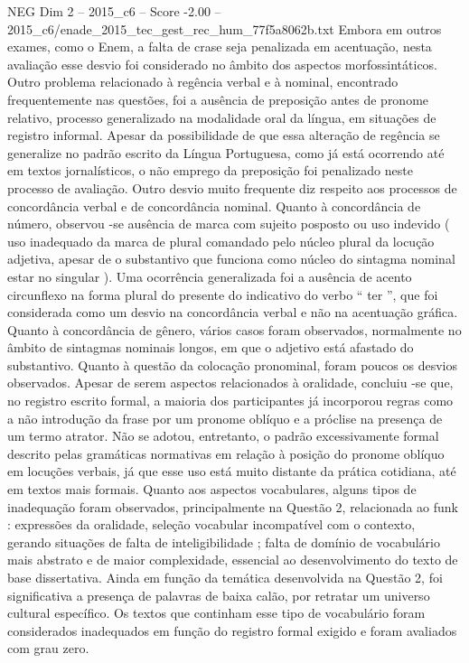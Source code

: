 \begin{textsample}{NEG Dim 2 – 2015\_c6 – Score -2.00 – 2015\_c6/enade\_2015\_tec\_gest\_rec\_hum\_77f5a8062b.txt}
Embora em outros exames, como o Enem, a falta de crase seja penalizada em acentuação, nesta avaliação esse desvio foi considerado no âmbito dos aspectos morfossintáticos.
Outro problema relacionado à regência verbal e à nominal, encontrado frequentemente nas questões, foi a ausência de preposição antes de pronome relativo, processo generalizado na modalidade oral da língua, em situações de registro informal.
Apesar da possibilidade de que essa alteração de regência se generalize no padrão escrito da Língua Portuguesa, como já está ocorrendo até em textos jornalísticos, o não emprego da preposição foi penalizado neste processo de avaliação.
Outro desvio muito frequente diz respeito aos processos de concordância verbal e de concordância nominal.
Quanto à concordância de número, observou -se ausência de marca com sujeito posposto ou uso indevido ( uso inadequado da marca de plural comandado pelo núcleo plural da locução adjetiva, apesar de o substantivo que funciona como núcleo do sintagma nominal estar no singular ).
Uma ocorrência generalizada foi a ausência de acento circunflexo na forma plural do presente do indicativo do verbo “ ter ”, que foi considerada como um desvio na concordância verbal e não na acentuação gráfica.
Quanto à concordância de gênero, vários casos foram observados, normalmente no âmbito de sintagmas nominais longos, em que o adjetivo está afastado do substantivo.
Quanto à questão da colocação pronominal, foram poucos os desvios observados.
Apesar de serem aspectos relacionados à oralidade, concluiu -se que, no registro escrito formal, a maioria dos participantes já incorporou regras como a não introdução da frase por um pronome oblíquo e a próclise na presença de um termo atrator.
Não se adotou, entretanto, o padrão excessivamente formal descrito pelas gramáticas normativas em relação à posição do pronome oblíquo em locuções verbais, já que esse uso está muito distante da prática cotidiana, até em textos mais formais.
Quanto aos aspectos vocabulares, alguns tipos de inadequação foram observados, principalmente na Questão 2, relacionada ao funk : expressões da oralidade, seleção vocabular incompatível com o contexto, gerando situações de falta de inteligibilidade ; falta de domínio de vocabulário mais abstrato e de maior complexidade, essencial ao desenvolvimento do texto de base dissertativa.
Ainda em função da temática desenvolvida na Questão 2, foi significativa a presença de palavras de baixa calão, por retratar um universo cultural específico.
Os textos que continham esse tipo de vocabulário foram considerados inadequados em função do registro formal exigido e foram avaliados com grau zero.

\end{textsample}
